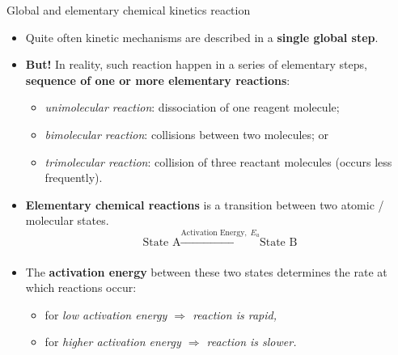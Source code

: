 \begin{frame}[<+->][shrink]{Global and elementary chemical kinetics reaction}
	
	\begin{itemize}
		\item Quite often kinetic mechanisms are described in a \textbf{single global step}. 
		\item \textbf{But!} In reality, such reaction happen in a series of elementary steps, \textbf{sequence of one or more
			elementary reactions}:
		\begin{itemize}
			\item {\it unimolecular reaction}: dissociation of one reagent molecule;
			\item {\it bimolecular reaction}: collisions between two molecules; or
			\item{ \it trimolecular reaction}: collision of three reactant molecules (occurs less frequently).
		\end{itemize}
		\item \alert{\textbf{Elementary chemical reactions}} is a transition between two atomic / molecular states. 
		$$\mbox{State A} \xrightarrow[]{\text{Activation Energy}, \;E_a} \mbox{State B}$$
		\item The \textbf{activation energy} between these two states determines \alert{the rate at which reactions occur}: 
		\begin{itemize}
			\item for \it{low activation energy} $\Rightarrow$ reaction is rapid, 
			\item for \it{higher activation energy} $\Rightarrow$ reaction is slower.
		\end{itemize}
	\end{itemize}
	
\end{frame}
%
%
